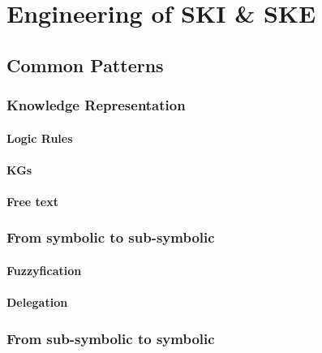 \documentclass[12pt,a4paper,openright,twoside]{book}
\begin{document}
\part{Engineering of \ac{SKI} \& \ac{SKE}}\label{part:engineering-of-ski-ske}


\chapter{Common Patterns}\label{ch:common-patterns}

\section{Knowledge Representation}\label{sec:knowledge-representation}

\subsection{Logic Rules}\label{subsec:logic-rules}

\subsection{\Aclp{KG}}\label{subsec:kg}

\subsection{Free text}\label{subsec:free-text}

\section{From symbolic to sub-symbolic}\label{sec:from-symbolic-to-sub-symbolic}

\subsection{Fuzzyfication}\label{subsec:fuzzyfication}

\subsection{Delegation}\label{subsec:delegation}

\section{From sub-symbolic to symbolic}\label{sec:from-sub-symbolic-to-symbolic}
\end{document}
